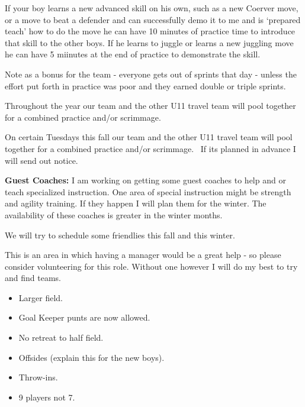 \documentclass[10pt,letterpaper]{article}
\newenvironment{agendablock}[1]{%
    \tcolorbox[beamer,%
    noparskip,breakable,
    colback=LightGray,colframe=Black,%
    colbacklower=Gray!75!LightGray,%
    title=#1]}%
    {\endtcolorbox}
\newenvironment{evenBlock}[1]{%
    \tcolorbox[beamer,%
    noparskip,breakable,
    colback=LightGreen,colframe=DarkGreen,%
    colbacklower=LimeGreen!75!LightGreen,%
    title=#1]}%
    {\endtcolorbox}
\begin{document}
\begin{agendablock}{Skill Building Encouragement and Leadership}
If your boy learns a new advanced skill on his own, such as a new Coerver move, or a move to beat a defender and can successfully demo it to me and is `prepared teach' how to do the move he can have 10 minutes of practice time to introduce that skill to the other boys.  If he learns to juggle or learns a new juggling move he can have 5 miinutes at the end of practice to demonstrate the skill.

Note as a bonus for the team - everyone gets out of sprints that day - unless the effort put forth in practice was poor and they earned double or triple sprints.
\end{agendablock}

\begin{agendablock}{Practice Variations}
Throughout the year our team and the other U11 travel team will pool together for a combined practice and/or scrimmage.

On certain Tuesdays this fall our team and the other U11 travel team will pool together for a combined practice and/or scrimmage.  If its planned in advance I will send out notice.

\textbf{Guest Coaches:}
I am working on getting some guest coaches to help and or teach specialized instruction.  One area of special instruction might be strength and agility training.  If they happen I will plan them for the winter.  The availability of these coaches is greater in the winter months.
\end{agendablock}

\begin{agendablock}{Friendly Scrimmages}
We will try to schedule some friendlies this fall and this winter.

This is an area in which having a manager would be a great help - so please consider volunteering for this role.
Without one however I will do my best to try and find teams.

\end{agendablock}

\begin{evenBlock}{U10 vs U11 Rule Changes}
    \begin{itemize}
        \item Larger field.
        \item Goal Keeper punts are now allowed.
        \item No retreat to half field.
        \item Offsides (explain this for the new boys).
        \item Throw-ins.
        \item 9 players not 7.
    \end{itemize}
\end{evenBlock}
\end{document}

